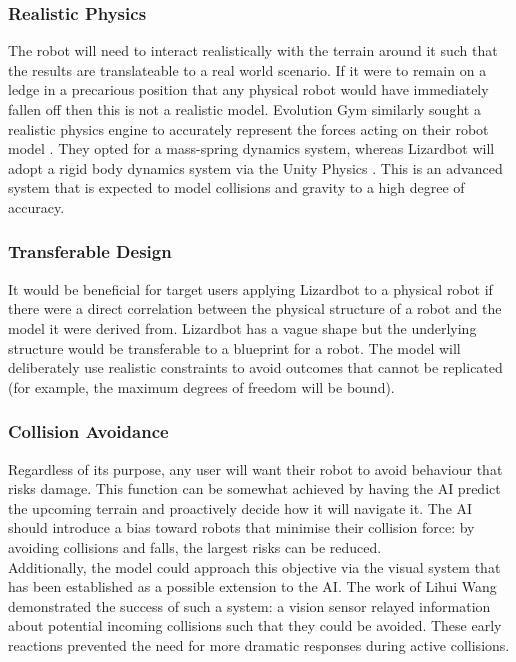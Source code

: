 \documentclass{article}
\begin{document}
\subsubsection{Realistic Physics}
\label{sec:Realistic Physics}
The robot will need to interact realistically with the terrain around it such that the results are translateable to a real world scenario. If it were to remain on a ledge in a precarious position that any physical robot would have immediately fallen off then this is not a realistic model. Evolution Gym similarly sought a realistic physics engine to accurately represent the forces acting on their robot model . They opted for a mass-spring dynamics system, whereas Lizardbot will adopt a rigid body dynamics system via the Unity Physics . This is an advanced system that is expected to model collisions and gravity to a high degree of accuracy. 


\subsubsection{Transferable Design}
\label{sec:Transferable Design}
It would be beneficial for target users applying Lizardbot to a physical robot if there were a direct correlation between the physical structure of a robot and the model it were derived from.  Lizardbot has a vague shape but the underlying structure would be transferable to a blueprint for a robot. The model will deliberately use realistic constraints to avoid outcomes that cannot be replicated (for example, the maximum degrees of freedom will be bound).

\subsubsection{Collision Avoidance}
\label{sec:Risk Reduction}
Regardless of its purpose, any user will want their robot to avoid behaviour that risks damage. This function can be somewhat achieved by having the AI predict the upcoming terrain and proactively decide how it will navigate it. The AI should introduce a bias toward robots that minimise their collision force: by avoiding collisions and falls, the largest risks can be reduced. \\
Additionally, the model could approach this objective via the visual system that has been established as a possible extension to the AI. The work of Lihui Wang  demonstrated the success of such a system: a vision sensor relayed information about potential incoming collisions such that they could be avoided. These early reactions prevented the need for more dramatic responses during active collisions.
\end{document}
